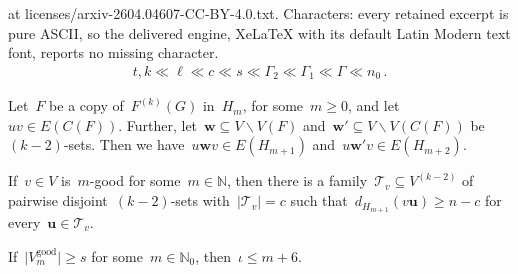 \documentclass[10pt,a4paper]{amsart}
\let\setminus=\smallsetminus
\let\setminus=\smallsetminus
\newcommand{\cT}{\mathcal{T}}
\begin{document}
at licenses/arxiv-2604.04607-CC-BY-4.0.txt. Characters: every retained excerpt is pure ASCII, so the delivered engine, XeLaTeX with its default Latin Modern text font, reports no missing character.
	\begin{align}\label{eq:hierarchy}
		t,k \ll \ell \ll c \ll s \ll \Gamma_2 \ll \Gamma_1 \ll \Gamma \ll n_0\,.
	\end{align}

	\begin{observation}\label{obs:almostfulldegree}
		Let~$F$ be a copy of~$F^{(k)}(G)$ in~$H_m$, for some~$m \geq 0$, and let~$uv \in E(C(F))$.
        Further, let~$\mathbf{w} \subseteq V \setminus V(F)$ and~$\mathbf{w}' \subseteq V \setminus V(C(F))$ be~$(k-2)$-sets.
        Then we have~$u\mathbf{w}v\in E(H_{m+1})$ and~$u\mathbf{w}'v\in E(H_{m+2})$.
	\end{observation}

    \begin{observation}\label{obs:manycenteredges->good}
        If~$v\in V$ is~$m$-good for some~$m\in\mathds{N}$, then there is a family~$\cT_v\subseteq V^{(k-2)}$ of pairwise disjoint~$(k-2)$-sets with~$\vert\cT_v\vert=c$ such that~$d_{H_{m+1}}(v\mathbf{u})\geq n-c$ for every~$\mathbf{u}\in\cT_v$.
    \end{observation}

	\begin{lemma} \label{lem:good+6}
		If~$\vert V_m^{\text{good}}\vert\geq s$ for some~$m\in\mathds{N}_0$, then~$\iota\leq m+6$.
	\end{lemma}
\end{document}
